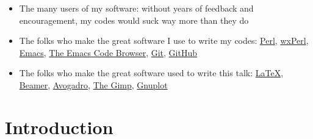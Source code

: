 \documentclass[10pt, xcolor=x11names, compress]{beamer}
\begin{document}
\begin{frame}
  \begin{itemize}
    \footnotesize
  \item The many users of my software: without years of feedback and
    encouragement, my codes would suck way more than they do
  \item The folks who make the great software I use to write my codes:
    \href{http://www.perl.org}{\color{Blue4}Perl},
    \href{http://wxperl.sourceforge.net/}{\color{Blue4}wxPerl},
    \href{http://www.gnu.org/software/emacs/}{\color{Blue4}Emacs},
    \href{http://ecb.sourceforge.net}{\color{Blue4}The Emacs Code Browser},
    \href{http://git-scm.com/}{\color{Blue4}Git},
    \href{http://github.com/}{\color{Blue4}GitHub}
  \item The folks who make the great software used to write this talk:
    \href{http://tug.ctan.org}{\color{Blue4}\LaTeX},
    \href{http://latex-beamer.sourceforge.net}{\color{Blue4}Beamer},
    \href{http://avogadro.sourceforge.net}{\color{Blue4}Avogadro},
    \href{http://www.gimp.org}{\color{Blue4}The Gimp},
    \href{http://www.gnuplot.info}{\color{Blue4}Gnuplot}
  \end{itemize}
\end{frame}




\section[Introduction]{Introduction}

  
\end{document}
